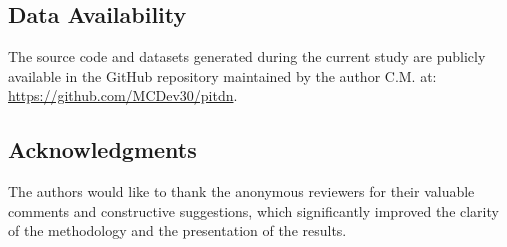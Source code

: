 \documentclass[11pt,reqno]{amsart}
\theoremstyle{plain}
\theoremstyle{definition}
\theoremstyle{remark}
\begin{document}
\subsection*{Data Availability}
The source code and datasets generated during the current study are publicly available in the GitHub repository maintained by the author C.M. at: \url{https://github.com/MCDev30/pitdn}.

\subsection*{Acknowledgments}
The authors would like to thank the anonymous reviewers for their valuable comments and constructive suggestions, which significantly improved the clarity of the methodology and the presentation of the results.




\end{document}
